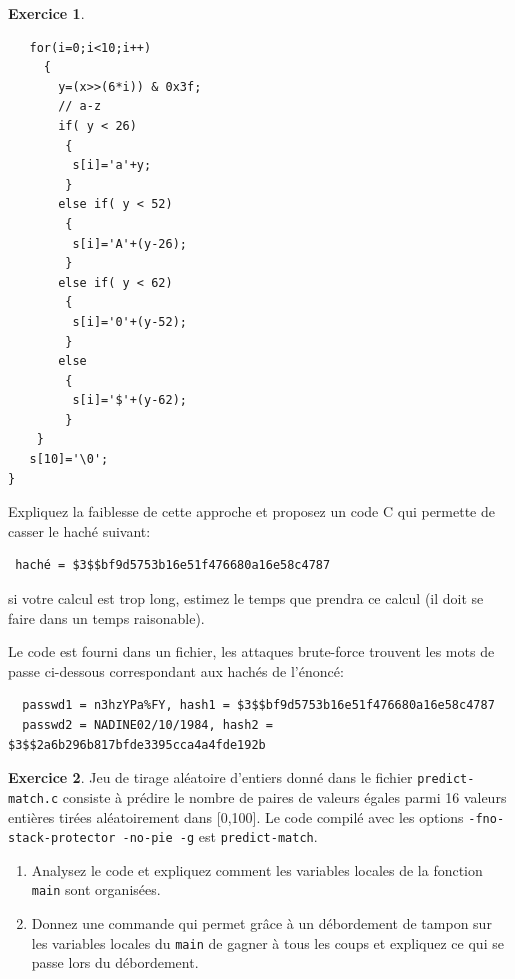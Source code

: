 \documentclass[a4paper,9pt]{article}
\theoremstyle{plain}
\theoremstyle{definition}
\newtheorem{exercice}{Exercice}
\newenvironment{terminal}{\color{black}\begin{snugshade*}}
{\end{snugshade*}\color{black}}
\begin{document}
\begin{exercice}
\begin{enumerate}
\begin{terminal}
\begin{verbatim}
   for(i=0;i<10;i++)
     {
       y=(x>>(6*i)) & 0x3f;
       // a-z
       if( y < 26)
        {
         s[i]='a'+y;
        }
       else if( y < 52)
        {
         s[i]='A'+(y-26);
        }
       else if( y < 62)
        {
         s[i]='0'+(y-52);
        }
       else
        {
         s[i]='$'+(y-62);
        }
    }
   s[10]='\0';
}
\end{verbatim}
\end{terminal}
Expliquez la faiblesse de cette approche et proposez un code C qui permette de casser le haché suivant:
\begin{verbatim}
 haché = $3$$bf9d5753b16e51f476680a16e58c4787
\end{verbatim}
si votre calcul est trop long, estimez le temps que prendra ce calcul (il doit se faire dans un temps raisonable).
  \end{enumerate}
\end{exercice}

\begin{correction}
  Le code est fourni dans un fichier, les attaques brute-force trouvent les mots de passe  ci-dessous  correspondant aux hachés de l'énoncé:
\begin{verbatim}
  passwd1 = n3hzYPa%FY, hash1 = $3$$bf9d5753b16e51f476680a16e58c4787
  passwd2 = NADINE02/10/1984, hash2 = $3$$2a6b296b817bfde3395cca4a4fde192b
\end{verbatim}
\end{correction}

\bigskip

\begin{exercice}
  Jeu de tirage aléatoire d'entiers donné dans le fichier \verb|predict-match.c| consiste à prédire le nombre de paires de valeurs égales parmi 16 valeurs entières tirées aléatoirement dans [0,100]. Le code compilé avec les options \verb|-fno-stack-protector -no-pie -g| est \verb|predict-match|.

  


  
  \begin{enumerate}
  \item Analysez le code et expliquez comment les variables locales de la fonction \verb|main|  sont organisées.
  \item Donnez une commande qui permet grâce à un débordement de tampon sur les variables locales du \verb|main| de  gagner à tous les coups et expliquez ce qui se passe lors du débordement. 
    \end{enumerate}
  
\end{exercice}
\end{document}
